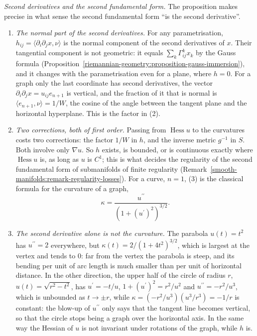 \begin{remark}\label{riemannian-geometry:remark-graph-hessian}
\emph{Second derivatives and the second fundamental form.} The proposition makes precise in what sense the second fundamental form ``is the second derivative''.
\begin{enumerate}
\item \emph{The normal part of the second derivatives.} For any parametrisation, $h_{ij} = \langle\partial_i\partial_jx, \nu\rangle$ is the normal component of the second derivatives of $x$. Their tangential
component is not geometric: it equals $\sum_k\Gamma^k_{ij}x_k$ by the Gauss formula (Proposition~\ref{riemannian-geometry:proposition-gauss-immersion}), and it changes with the parametrisation even for a
plane, where $h = 0$. For a graph only the last coordinate has second derivatives, the vector $\partial_i\partial_jx = u_{ij}e_{n+1}$ is vertical, and the fraction of it that is normal is
$\langle e_{n+1}, \nu\rangle = 1/W$, the cosine of the angle between the tangent plane and the horizontal hyperplane. This is the factor in (2).
\item \emph{Two corrections, both of first order.} Passing from $\operatorname{Hess}u$ to the curvatures costs two corrections: the factor $1/W$ in $h$, and the inverse metric $g^{-1}$ in $S$. Both involve
only $\nabla u$. So $h$ exists, is bounded, or is continuous exactly where $\operatorname{Hess}u$ is, as long as $u$ is $C^1$; this is what decides the regularity of the second fundamental form of
submanifolds of finite regularity (Remark~\ref{smooth-manifolds:remark-regularity-losses}). For a curve, $n = 1$, (3) is the classical formula for the curvature of a graph,
\[
\kappa = \frac{u^{\prime\prime}}{(1 + (u^{\prime})^2)^{3/2}} .
\]
\item \emph{The second derivative alone is not the curvature.} The parabola $u(t) = t^2$ has $u^{\prime\prime} = 2$ everywhere, but $\kappa(t) = 2/(1 + 4t^2)^{3/2}$, which is largest at the vertex and tends to $0$: far
from the vertex the parabola is steep, and its bending per unit of arc length is much smaller than per unit of horizontal distance. In the other direction, the upper half of the circle of radius $r$, $u(t) = \sqrt{r^2 - t^2}$,
has $u^{\prime} = -t/u$, $1 + (u^{\prime})^2 = r^2/u^2$ and $u^{\prime\prime} = -r^2/u^3$, which is unbounded as $t \to \pm r$, while $\kappa = (-r^2/u^3)(u^3/r^3) = -1/r$ is constant: the blow-up of $u^{\prime\prime}$
only says that the tangent line becomes vertical, so that the circle stops being a graph over the horizontal axis. In the same way the Hessian of $u$ is not invariant under rotations of the graph, while $h$ is.

\end{enumerate}
\end{remark}
